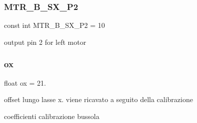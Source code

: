 \subsubsection{\texorpdfstring{M\+T\+R\+\_\+\+B\+\_\+\+S\+X\+\_\+\+P2}{MTR\_B\_SX\_P2}}
{\footnotesize\ttfamily const int M\+T\+R\+\_\+\+B\+\_\+\+S\+X\+\_\+\+P2 = 10}

output pin 2 for left motor \mbox{\label{ari_pi__2_d_c__esp__08_8ino_ab9355e95cf7b931e4ac76a90c7b163c6}} 
\subsubsection{\texorpdfstring{ox}{ox}}
{\footnotesize\ttfamily float ox = 21.}



offset lungo l\textquotesingle{}asse x. viene ricavato a seguito della calibrazione 

coefficienti calibrazione bussola 